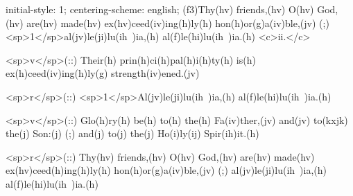 initial-style: 1;
centering-scheme: english;
(f3)Thy(hv) friends,(hv) O(hv) God,(hv) are(hv) made(hv) ex(hv)ceed(iv)ing(h)ly(h) hon(h)or(g)a(iv)ble,(jv) (;) <sp>1</sp>al(jv)le(ji)lu(ih~)ia,(h) al(f)le(hi)lu(ih~)ia.(h) <c>ii.</c>

<sp>v</sp>(::) Their(h) prin(h)ci(h)pal(h)i(h)ty(h) is(h) ex(h)ceed(iv)ing(h)ly(g) strength(iv)ened.(jv)

<sp>r</sp>(::) <sp>1</sp>Al(jv)le(ji)lu(ih~)ia,(h) al(f)le(hi)lu(ih~)ia.(h)

<sp>v</sp>(::) Glo(h)ry(h) be(h) to(h) the(h) Fa(iv)ther,(jv) and(jv) to(kxjk) the(j) Son:(j) (;) and(j) to(j) the(j) Ho(i)ly(ij) Spir(ih)it.(h)

<sp>r</sp>(::) Thy(hv) friends,(hv) O(hv) God,(hv) are(hv) made(hv) ex(hv)ceed(h)ing(h)ly(h) hon(h)or(g)a(iv)ble,(jv) (;) al(jv)le(ji)lu(ih~)ia,(h) al(f)le(hi)lu(ih~)ia.(h)